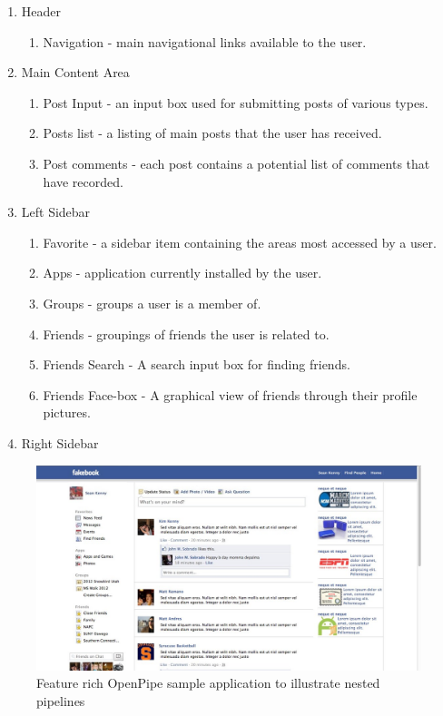 \documentclass[12pt]{report}
\begin{document}
\begin{enumerate}
  \item Header
	\begin{enumerate}
		\item Navigation - main navigational links available to the user.
	\end{enumerate}
  \item Main Content Area
	\begin{enumerate}
		\item Post Input - an input box used for submitting posts of various types.
		\item Posts list - a listing of main posts that the user has received.
		\item Post comments - each post contains a potential list of comments that have recorded.
	\end{enumerate}
  \item Left Sidebar
	\begin{enumerate}
		\item Favorite - a sidebar item containing the areas most accessed by a user.
		\item Apps - application currently installed by the user.
		\item Groups - groups a user is a member of.
		\item Friends - groupings of friends the user is related to.
		\item Friends Search - A search input box for finding friends.
		\item Friends Face-box - A graphical view of friends through their profile pictures.
	\end{enumerate}
  \item Right Sidebar
\end{enumerate}


\begin{figure}[H]
\label{fig:sampleApp}
\centering
\includegraphics[width=\textwidth,keepaspectratio]{figures/images/sample_app.jpg}
\caption{Feature rich OpenPipe sample application to illustrate nested pipelines}
\end{figure}
\end{document}
